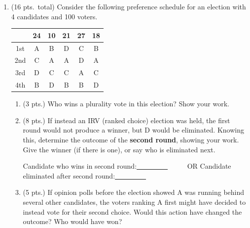 \documentclass[12pt]{article}
\begin{document}
\begin{enumerate}
\item (16 pts.~total) \label{prob:jr-one} Consider the following preference schedule for an election with 4 candidates and 100 voters.

\begin{center}
\begin{tabular}{c||c|c|c|c|c|}
&24&10&21&27&18\\
\hline\hline
1st&A&B&D&C&B\\
2nd&C&A&A&D&A\\
3rd&D&C&C&A&C\\
4th&B&D&B&B&D
\end{tabular}
\end{center}

	\begin{enumerate}

	\item  (3 pts.) Who wins a plurality vote in this election? Show your work.
\vfill




	\item (8 pts.) If instead an IRV (ranked choice) election was held, the first round would not produce a winner, but D would be eliminated. Knowing this, determine the outcome of the {\bf second round}, showing your work. Give the winner (if there is one), or say who is eliminated next.
\vfill

\vfill

\hspace*{-.2in}Candidate who wins in second round:\underline{\ \ \ \ \ \ \ \ \ }
\ \ \ \ \ OR Candidate eliminated after second round:\underline{\ \ \ \ \ \ \ \ \ }\\


\item (5 pts.) If opinion polls before the election showed A was running behind several other candidates, the voters ranking A first might have decided to instead vote for their second choice. Would this action  have changed the outcome? Who would have won? 
\vfill
	\end{enumerate}



\end{enumerate}
\end{document}
